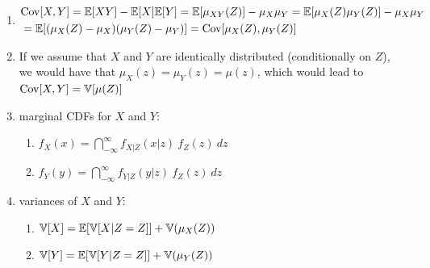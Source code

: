 \begin{enumerate}
    \item
    $
        \begin{aligned}
            &\text{Cov}[X, Y]
            = \mathbb{E}[X Y] - \mathbb{E}[X] \mathbb{E}[Y]
            = \mathbb{E}[\mu_{X Y} (Z )] - \mu_X \mu_Y
            = \mathbb{E}[\mu_X (Z )\mu_Y (Z )] - \mu_X \mu_Y\\
            &= \mathbb{E}[(\mu_X (Z ) - \mu_X )(\mu_Y (Z ) - \mu_Y )]
            = \text{Cov}[\mu_X (Z ), \mu_Y (Z )]
        \end{aligned}
    $
    \hfill \cite{statistics/book/Statistics-for-Data-Scientists/Maurits-Kaptein}

    \item If we assume that $X$ and $Y$ are identically distributed (conditionally on $Z$), we would have that $\mu_X (z) = \mu_Y (z) = \mu(z)$, which would lead to $\text{Cov}[X, Y] = \mathbb{V}[\mu(Z)] $
    \hfill \cite{statistics/book/Statistics-for-Data-Scientists/Maurits-Kaptein}

    \item marginal CDFs for $X$ and $Y$:
    \hfill \cite{statistics/book/Statistics-for-Data-Scientists/Maurits-Kaptein}
    \begin{multicols}{2}
    \begin{enumerate}
        \item $ f_X (x) = \dint_{-\infty}^\infty f_{X|Z} (x|z)\ f_Z (z)\ dz $
        \hfill \cite{statistics/book/Statistics-for-Data-Scientists/Maurits-Kaptein}

        \item $ f_Y (y) = \dint_{-\infty}^\infty f_{Y |Z} (y|z)\ f_Z (z)\ dz $
        \hfill \cite{statistics/book/Statistics-for-Data-Scientists/Maurits-Kaptein}
    \end{enumerate}
    \end{multicols}

    \item variances of $X$ and $Y$:
    \hfill \cite{statistics/book/Statistics-for-Data-Scientists/Maurits-Kaptein}
    \begin{multicols}{2}
    \begin{enumerate}
        \item $\mathbb{V}[X] = \mathbb{E}[\mathbb{V}[X|Z = Z]] + \mathbb{V}(\mu_X (Z ))$
        \hfill \cite{statistics/book/Statistics-for-Data-Scientists/Maurits-Kaptein}

        \item $\mathbb{V}[Y] = \mathbb{E}[\mathbb{V}[Y |Z = Z]] + \mathbb{V}(\mu_Y (Z ))$
        \hfill \cite{statistics/book/Statistics-for-Data-Scientists/Maurits-Kaptein}
    \end{enumerate}
    \end{multicols}


\end{enumerate}

